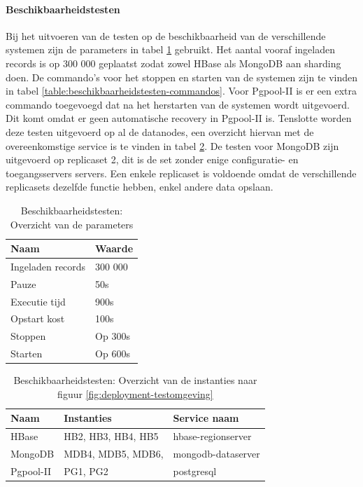 \paragraph{Beschikbaarheidstesten} Bij het uitvoeren van de testen op de beschikbaarheid van de verschillende systemen zijn de parameters in tabel \ref{table:beschikbaarheidstesten-parameters} gebruikt. Het aantal vooraf ingeladen records is op 300 000 geplaatst zodat zowel HBase als MongoDB aan sharding doen. De commando's voor het stoppen en starten van de systemen zijn te vinden in tabel \ref{table:beschikbaarheidstesten-commandos}.  Voor Pgpool-II is er een extra commando toegevoegd dat na het herstarten van de systemen wordt uitgevoerd. Dit komt omdat er geen automatische recovery in Pgpool-II is. Tenslotte worden deze testen uitgevoerd op al de datanodes, een overzicht hiervan met de overeenkomstige service is te vinden in tabel \ref{table:beschikbaarheidstesten-nodes}. De testen voor MongoDB zijn uitgevoerd op replicaset 2, dit is de set zonder enige configuratie- en toegangsservers servers. Een enkele replicaset is voldoende omdat de verschillende replicasets dezelfde functie hebben, enkel andere data opslaan. 

\begin{table}[ht!]
	\centering
	\begin{tabular}{l| l }
		\textbf{Naam} & \textbf{Waarde}  \\
		\hline
		Ingeladen records  & 300 000 \\
		Pauze & 50s \\
		Executie tijd & 900s \\
		Opstart kost & 100s \\
		Stoppen & Op 300s \\
		Starten & Op 600s \\
	\end{tabular}
	\caption{Beschikbaarheidstesten: Overzicht van de parameters}
	\label{table:beschikbaarheidstesten-parameters}
\end{table}


\begin{table}[ht!]
	\centering
	\begin{tabular}{l| l l }
		\textbf{Naam} & \textbf{Instanties} & \textbf{Service naam} \\
		\hline
		HBase  & HB2, HB3, HB4, HB5 & hbase-regionserver \\
		MongoDB  & MDB4, MDB5, MDB6, & mongodb-dataserver\\
		Pgpool-II  & PG1, PG2 & postgresql \\
	\end{tabular}
	\caption{Beschikbaarheidstesten: Overzicht van de instanties naar figuur \ref{fig:deployment-testomgeving}}
	\label{table:beschikbaarheidstesten-nodes}
\end{table}

